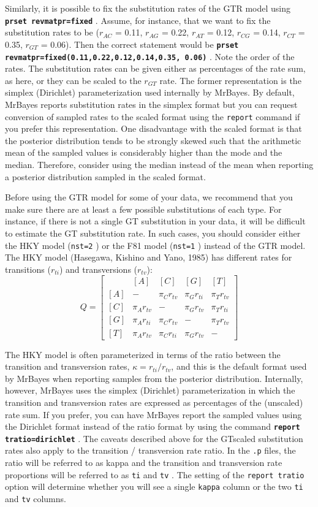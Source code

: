 \documentclass[12pt]{book}
\newcommand{\ttt}[1]{\texttt{#1} }
\newcommand{\tb}[1]{\ttt{\textbf{#1}} }
\begin{document}
Similarly, it is possible to fix the substitution rates of the GTR model using \tb{prset
revmatpr=fixed}. Assume, for instance, that we want to fix the substitution rates to be ($r_{AC}$ =
0.11, $r_{AG}$ = 0.22, $r_{AT}$ = 0.12, $r_{CG}$ = 0.14, $r_{CT}$ = 0.35, $r_{GT}$ = 0.06).  Then
the correct statement would be \tb{prset revmatpr=fixed(0.11,0.22,0.12,0.14,0.35, 0.06)}. Note the
order of the rates. The substitution rates can be given either as percentages of the rate sum, as
here, or they can be scaled to the $r_{GT}$ rate. The former representation is the simplex
(Dirichlet) parameterization used internally by MrBayes. By default, MrBayes reports substitution
rates in the simplex format but you can request conversion of sampled rates to the scaled format
using the \ttt{report} command if you prefer this representation. One disadvantage with the scaled
format is that the posterior distribution tends to be strongly skewed such that the arithmetic mean
of the sampled values is considerably higher than the mode and the median. Therefore, consider
using the median instead of the mean when reporting a posterior distribution sampled in the scaled
format.

Before using the GTR model for some of your data, we recommend that you make sure there are at
least a few possible substitutions of each type. For instance, if there is not a single GT
substitution in your data, it will be difficult to estimate the GT substitution rate. In such
cases, you should consider either the HKY model (\ttt{nst=2}) or the F81 model (\ttt{nst=1})
instead of the GTR model. The HKY model (Hasegawa, Kishino and Yano, 1985) has different rates for
transitions ($r_{ti}$) and transversions ($r_{tv}$): \[ Q=\begin{bmatrix} & [A] & [C] & [G] & [T]
    \\ [A]& - & \pi_C r_{tv} & \pi_G r_{ti} & \pi_T r_{tv}\\ [C]& \pi_A r_{tv} & - & \pi_G r_{tv}
&\pi_T r_{ti} \\ [G]& \pi_A r_{ti} & \pi_C r_{tv}& - & \pi_T r_{tv}\\ [T]& \pi_A r_{tv} & \pi_C
r_{ti}&\pi_G r_{tv}  & - \end{bmatrix} \]

The HKY model is often parameterized in terms of the ratio between the transition and transversion
rates, $\kappa = r_{ti}/r_{tv}$, and this is the default format used by MrBayes when reporting
samples from the posterior distribution. Internally, however, MrBayes uses the simplex (Dirichlet)
parameterization in which the transition and transversion rates are expressed as percentages of the
(unscaled) rate sum. If you prefer, you can have MrBayes report the sampled values using the
Dirichlet format instead of the ratio format by using the command \tb{report tratio=dirichlet}. The
caveats described above for the GTscaled substitution rates also apply to the transition /
transversion rate ratio. In the \ttt{.p} files, the ratio will be referred to as kappa and the
transition and transversion rate proportions will be referred to as \ttt{ti} and \ttt{tv}. The
setting of the \ttt{report tratio} option will determine whether you will see a single \ttt{kappa}
column or the two \ttt{ti} and \ttt{tv} columns.
\end{document}
